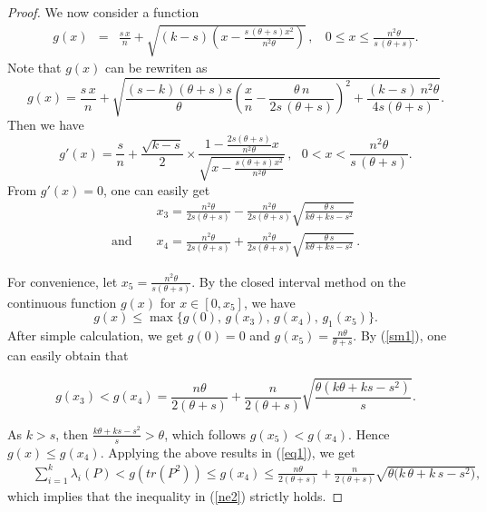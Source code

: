 \documentclass[10pt,a4paper]{amsart}
\begin{document}
\begin{proof}
 \vspace*{3mm}

 \noindent
 We now consider a function
 \begin{eqnarray}
 g(x)&=&\frac{s\,x}{n}+\sqrt{(k-s)\left(x-\frac{s\,(\theta+s)x^2}{n^2\theta}\right)}\,,~~~~0\leq x\leq \frac{n^2\theta}{s\,(\theta+s)}.\nonumber
 \end{eqnarray}
 Note that $g(x)$ can be rewriten as
 \begin{equation}
g(x)=\frac{s\,x}{n}+\sqrt{\frac{(s-k)(\theta+s)s}{\theta}\left(\frac{x}{n}-\frac{\theta\,n}{2s\,(\theta+s)}\right)^2+\frac{(k-s)\
     n^2\theta}{4s(\theta+s)}}. \label{sm1}
 \end{equation}
  Then we have
 \begin{equation}
 g'(x)= \frac{s}{n}+\frac{\sqrt{k-s}}{2}\times\frac{\displaystyle{1-\frac{2s(\theta+s)}{n^2\theta}x}}{\sqrt{\displaystyle{x-\frac{s(\theta+s)x^2}{n^2\theta}}}}\,,~~~0<x<\frac{n^2\theta}{s\,(\theta+s)}.\nonumber
 \end{equation}
 From $g'(x)=0$, one can easily get
 \begin{eqnarray}
  &&x_3=\frac{n^2\theta}{2s(\theta+s)}-\frac{n^2\theta}{2s(\theta+s)}\sqrt{\frac{\theta\,s}{k\theta+ks-s^2}}\nonumber\\[2mm]
  \mbox{and }&&x_4=\frac{n^2\theta}{2s(\theta+s)}+\frac{n^2\theta}{2s(\theta+s)}\sqrt{\frac{\theta\,s}{k\theta+ks-s^2}}\,.\nonumber
 \end{eqnarray}

 \noindent
 For convenience, let $x_5=\displaystyle{\frac{n^2\theta}{s(\theta+s)}}$. By the closed interval method on the continuous function $g(x)$ for $x\in \left[0,x_5\right]$, we have
 $$g(x)\leq \max\Big\{g(0),\,g(x_3),\,g(x_4),\,g_1(x_5)\Big\}.$$
 After simple calculation, we get $g(0)=0$ and $g(x_5)=\frac{n\theta}{\theta+s}$. By (\ref{sm1}), one can easily obtain that

 $$g(x_3)<g(x_4)=\frac{n\theta}{2(\theta+s)}+\frac{n}{2(\theta+s)}
 \sqrt{\frac{\theta(k\theta+ks-s^2)}{s}}.$$


 \noindent
 As $k>s$, then $\frac{k\theta+ks-s^{2}}{s}>\theta$, which follows $g(x_5)<g(x_4)$. Hence $g(x)\leq g(x_4)$.
 Applying the above results in (\ref{eq1}), we get
  \begin{eqnarray}
 &&\sum_{i=1}^{k}\lambda_i(P)< g(tr(P^2))\leq g(x_4)\leq\frac{n\theta}{2(\theta+s)}+\frac{n}{2(\theta+s)}
   \sqrt{\theta\big(k\,\theta+k\,s-s^2\big)},\nonumber
 \end{eqnarray}
 which implies that the inequality in (\ref{ne2}) strictly holds.
\vspace*{3mm}


\end{proof}
\end{document}

